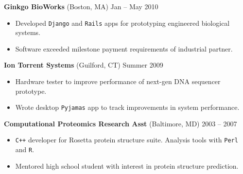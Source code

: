 \documentclass[margin]{res}
\newcommand{\locdatesubsection}[3]{\textbf{#1} (#2) \hfill #3}
\begin{document}
\begin{sloppypar}
\begin{resume}
\locdatesubsection{Ginkgo BioWorks}{Boston, MA}{Jan -- May 2010}
\begin{itemize}
\item Developed \texttt{Django} and \texttt{Rails} apps for prototyping engineered biological systems.
\item Software exceeded milestone payment requirements of industrial partner.
\end{itemize}

\locdatesubsection{Ion Torrent Systems}{Guilford, CT}{Summer 2009}
\begin{itemize}
\item Hardware tester to improve performance of next-gen DNA sequencer prototype.
\item Wrote desktop \texttt{Pyjamas} app to track improvements in system performance.
\end{itemize}

\locdatesubsection{Computational Proteomics Research Asst}{Baltimore, MD}{2003 -- 2007}
\begin{itemize}
\item \texttt{C++} developer for Rosetta protein structure suite. Analysis tools with \texttt{Perl} and \texttt{R}.
\item Mentored high school student with interest in protein structure prediction.
\end{itemize}


\end{resume}
\end{sloppypar}
\end{document}
